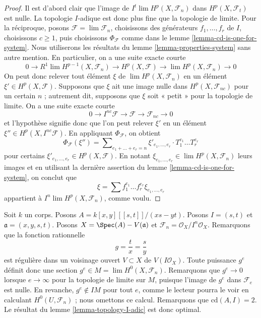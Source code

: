 \begin{proof}
Il est d'abord clair que l'image de $I^t \lim H^p(X, \mathcal{F}_n)$
dans $H^p(X, \mathcal{F}_t)$ est nulle. La topologie $I$-adique
est donc plus fine que la topologie de limite. Pour la réciproque, posons
$\mathcal{F} = \lim \mathcal{F}_n$, choisissons des générateurs $f_1, \ldots, f_r$
de $I$, choisissons $c \geq 1$, puis choisissons
$\Phi_\mathcal{F}$ comme dans le lemme \ref{lemma-cd-is-one-for-system}.
Nous utiliserons les résultats du lemme \ref{lemma-properties-system}
sans autre mention. En particulier, on a une suite exacte
courte
$$
0 \to R^1\lim H^{p - 1}(X, \mathcal{F}_n) \to H^p(X, \mathcal{F})
\to \lim H^p(X, \mathcal{F}_n) \to 0
$$
On peut donc relever tout élément $\xi$ de $\lim H^p(X, \mathcal{F}_n)$
en un élément $\xi' \in H^p(X, \mathcal{F})$. Supposons que $\xi$ ait une image nulle
dans $H^p(X, \mathcal{F}_{nc})$ pour un certain $n$ ; autrement
dit, supposons que $\xi$ soit « petit » pour la topologie de limite. On a une
suite exacte courte
$$
0 \to I^{nc}\mathcal{F} \to \mathcal{F} \to \mathcal{F}_{nc} \to 0
$$
et l'hypothèse signifie donc que l'on peut relever $\xi'$ en un élément
$\xi'' \in H^p(X, I^{nc}\mathcal{F})$. En appliquant $\Phi_\mathcal{F}$,
on obtient
$$
\Phi_\mathcal{F}(\xi'') = \sum\nolimits_{e_1 + \ldots + e_r = n}
\xi'_{e_1, \ldots, e_r} \cdot T_1^{e_1} \ldots T_r^{e_r}
$$
pour certains $\xi'_{e_1, \ldots, e_r} \in H^p(X, \mathcal{F})$.
En notant $\xi_{e_1, \ldots, e_r} \in \lim H^p(X, \mathcal{F}_n)$
leurs images et en utilisant la dernière assertion du
lemme \ref{lemma-cd-is-one-for-system},
on conclut que
$$
\xi = \sum f_1^{e_1} \ldots f_r^{e_r} \xi_{e_1, \ldots, e_r}
$$
appartient à $I^n \lim H^p(X, \mathcal{F}_n)$, comme voulu.
\end{proof}

\begin{example}
\label{example-not-I-adic}
Soit $k$ un corps. Posons $A = k[x, y][[s, t]]/(xs - yt)$.
Posons $I = (s, t)$ et $\mathfrak a = (x, y, s, t)$.
Posons $X = \Spec(A) - V(\mathfrak a)$ et
$\mathcal{F}_n = \mathcal{O}_X/I^n\mathcal{O}_X$.
Remarquons que la fonction rationnelle
$$
g = \frac{t}{x} = \frac{s}{y}
$$
est régulière dans un voisinage ouvert $V \subset X$ de
$V(I\mathcal{O}_X)$. Toute puissance $g^e$ définit donc une section
$g^e \in M = \lim H^0(X, \mathcal{F}_n)$. Remarquons que
$g^e \to 0$ lorsque $e \to \infty$ pour la topologie de limite sur $M$,
puisque l'image de $g^e$ dans $\mathcal{F}_e$ est nulle.
En revanche, $g^e \not \in IM$ pour tout $e$,
comme le lecteur pourra le voir en calculant $H^0(U, \mathcal{F}_n)$ ;
nous omettons ce calcul. Remarquons que $\text{cd}(A, I) = 2$.
Le résultat du lemme \ref{lemma-topology-I-adic} est donc optimal.
\end{example}









